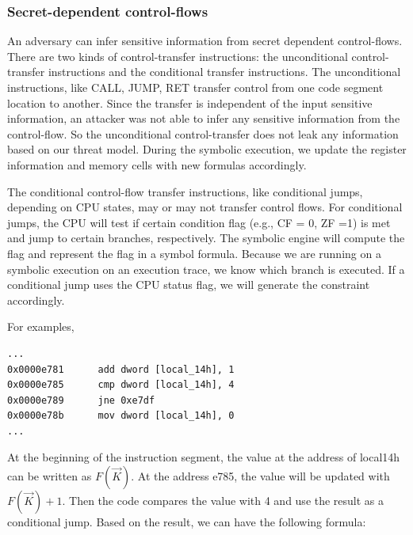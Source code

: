 \subsubsection{Secret-dependent control-flows}
An adversary can infer sensitive information from secret dependent control-flows. 
There are two kinds of control-transfer instructions: the unconditional 
control-transfer instructions and the conditional transfer instructions.
The unconditional instructions, like CALL, JUMP, RET transfer control
from one code segment location to another. Since the transfer is independent of the input sensitive information, an attacker was not able to infer any sensitive information from the control-flow. 
So the unconditional control-transfer does not leak any information based on our threat model. During the symbolic execution, 
we update the register information and memory cells with new formulas accordingly.

The conditional control-flow transfer instructions, like conditional jumps,
depending on CPU states, may or may not transfer control flows.
For conditional jumps, the CPU will test if certain condition flag 
(e.g., CF = 0, ZF =1) is met and jump to certain branches, respectively.
The symbolic engine will compute the flag and represent the flag in a symbol 
formula. Because we are running on a symbolic execution on an execution trace, 
we know which branch is executed.
If a conditional jump uses the CPU status flag, we will generate the constraint 
accordingly.



For examples,

\begin{lstlisting}
...
0x0000e781      add dword [local_14h], 1
0x0000e785      cmp dword [local_14h], 4
0x0000e789      jne 0xe7df
0x0000e78b      mov dword [local_14h], 0
...
\end{lstlisting}

At the beginning of the instruction segment, the value at the 
address of local14h can be written as $F(\vec{K})$. At the address e785, 
the value will be updated with $F(\vec{K})+1$. Then the code compares 
the value with 4 and use the result as a conditional jump. 
Based on the result, we can have the following formula:

